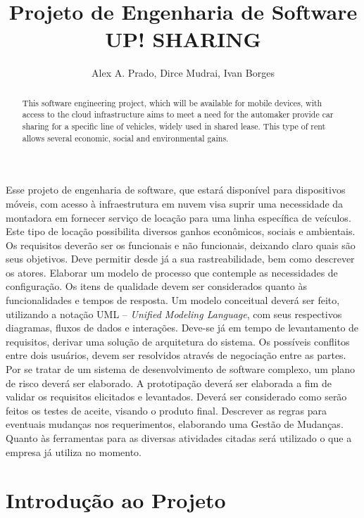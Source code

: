 \documentclass[12pt]{article}
\title{Projeto de Engenharia de Software \\ UP! SHARING}
\author{Alex A. Prado\inst{1}, Dirce Mudrai\inst{1}, Ivan Borges\inst{1} \email{alex.azprado@gmail.com, dirce.mudrai@icloud.com,
  ivangb@gmail.com}}
\begin{document}
 

\maketitle

\begin{abstract}

This software engineering project, which will be available for mobile devices, with access to the cloud infrastructure aims to meet a need for the automaker provide car sharing for a specific line of vehicles, widely used in shared lease. This type of rent allows several economic, social and environmental gains.
 
\end{abstract}
     
\begin{resumo} 

Esse projeto de engenharia de software, que estará disponível para dispositivos móveis, com acesso à infraestrutura em nuvem visa suprir uma necessidade da montadora em fornecer serviço de locação para uma linha específica de veículos. Este tipo de locação possibilita diversos ganhos econômicos, sociais e ambientais. 
Os requisitos deverão ser os funcionais e não funcionais, deixando claro quais são seus objetivos. Deve permitir desde já a sua rastreabilidade, bem como descrever os  atores. Elaborar um modelo de processo que contemple as necessidades de configuração.
Os itens de qualidade devem ser considerados quanto às funcionalidades   e tempos de resposta.
Um modelo conceitual deverá ser feito, utilizando a notação UML – \textit{Unified Modeling Language}, com seus respectivos diagramas, fluxos de dados e interações.
Deve-se já em tempo de levantamento de requisitos, derivar uma solução de arquitetura do sistema.
Os possíveis conflitos entre dois usuários, devem ser resolvidos através de negociação entre as partes. 
Por se tratar de um sistema de desenvolvimento de software complexo, um plano de risco deverá ser elaborado. 
A prototipação deverá ser elaborada a fim de validar os requisitos elicitados e levantados.
Deverá ser considerado como serão feitos os testes de aceite, visando o produto final.
Descrever as regras para eventuais mudanças nos requerimentos, elaborando uma Gestão de Mudanças.
Quanto às ferramentas para as diversas atividades citadas será utilizado o que a empresa já utiliza no momento.

\end{resumo}


\section{Introdução ao Projeto}
\end{document}
